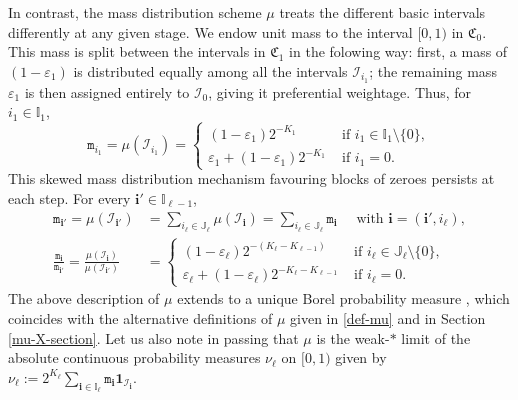 \documentclass[12pt, twoside]{article}
\theoremstyle{definition}
\numberwithin{equation}{section}
\begin{document}
\vskip0.1in
\noindent In contrast, the mass distribution scheme $\mu$ treats the different basic intervals differently at any given stage. We endow unit mass to the interval $[0,1)$ in $\mathfrak C_0$. This mass is split between the intervals in $\mathfrak C_1$ in the folowing way: first, a mass of $(1 - \varepsilon_1)$ is distributed equally among all the intervals $\mathscr{I}_{i_1}$; the remaining mass $\varepsilon_1$ is then assigned entirely to $\mathscr{I}_0$, giving it preferential weightage. Thus, for $i_1 \in \mathbb I_1$, 
\[ \mathtt m_{i_1} = \mu(\mathscr{I}_{i_1}) = \begin{cases} (1 - \varepsilon_1) 2^{-K_1} &\text{ if } i_1 \in \mathbb I_1 \setminus \{0\}, \\ \varepsilon_1 +
 (1 - \varepsilon_1) 2^{-K_1} &\text{ if } i_1 = 0. \end{cases} \] 
This skewed mass distribution mechanism favouring blocks of zeroes persists at each step. For every $\mathbf i' \in \mathbb I_{\ell-1}$, 
\begin{align*}  
\mathtt m_{\mathbf i'} = \mu(\mathscr{I}_{\mathbf i'}) &= \sum_{i_{\ell} \in \mathbb J_{\ell}} \mu(\mathscr{I}_{\mathbf i}) = \sum_{i_{\ell} \in \mathbb J_{\ell}} \mathtt m_{\mathbf i} \quad \text{ with } \mathbf i = (\mathbf i', i_{\ell}), \\ \frac{\mathtt m_{\mathbf i}}{\mathtt m_{\mathbf i'}} = \frac{\mu(\mathscr{I}_{\mathbf i})}{\mu(\mathscr{I}_{\mathbf i'})} &= 
\begin{cases} (1 - \varepsilon_\ell) 2^{-(K_\ell - K_{\ell-1})} &\text{ if } i_\ell \in \mathbb J_\ell \setminus \{0\}, \\ \varepsilon_\ell +
 (1 - \varepsilon_\ell) 2^{-K_\ell - K_{\ell-1}} &\text{ if } i_\ell = 0. \end{cases} 
  \end{align*} 
The above description of $\mu$ extends to a unique Borel probability measure  \cite[Proposition 1.7]{Falconer-book}, which coincides with the alternative definitions of $\mu$ given in \eqref{def-mu} and in Section \ref{mu-X-section}.  Let us also note in passing that $\mu$ is the weak-$\ast$ limit of the absolute continuous probability measures $\nu_{\ell}$ on $[0,1)$ given by $\nu_{\ell} := 2^{K_{\ell}} \sum_{\mathbf i \in \mathbb I_{\ell}} \mathtt m_{\mathbf i} \mathbf 1_{\mathscr{I}_{\mathbf i}}$.  
\end{document}
